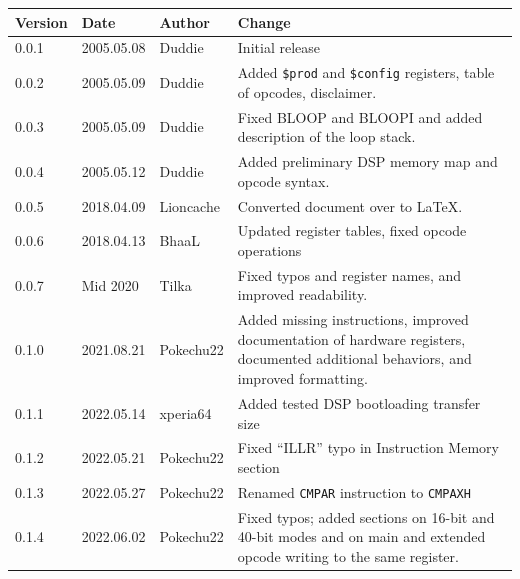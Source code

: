 \documentclass[oneside,english,a4paper,10pt,oneside,openany,final]{memoir}
\newcommand{\Register}[1]{\texttt{#1}}
\begin{document}
\begin{table}[htb]
\centering
\begin{tabular}{|p{.5in}|p{.75in}|p{.75in}|p{3.5in}|}
\hline
\textbf{Version} & \textbf{Date} & \textbf{Author} & \textbf{Change}                                                                          \\ \hline
0.0.1            & 2005.05.08    & Duddie          & Initial release                                                                          \\ \hline
0.0.2            & 2005.05.09    & Duddie          & Added \Register{\$prod} and \Register{\$config} registers, table of opcodes, disclaimer. \\ \hline
0.0.3            & 2005.05.09    & Duddie          & Fixed BLOOP and BLOOPI and added description of the loop stack.                          \\ \hline
0.0.4            & 2005.05.12    & Duddie          & Added preliminary DSP memory map and opcode syntax.                                      \\ \hline
0.0.5            & 2018.04.09    & Lioncache       & Converted document over to LaTeX.                                                        \\ \hline
0.0.6            & 2018.04.13    & BhaaL           & Updated register tables, fixed opcode operations                                         \\ \hline
0.0.7            & Mid 2020      & Tilka           & Fixed typos and register names, and improved readability.                                \\ \hline
0.1.0            & 2021.08.21    & Pokechu22       & Added missing instructions, improved documentation of hardware registers, documented additional behaviors, and improved formatting. \\ \hline
0.1.1            & 2022.05.14    & xperia64        & Added tested DSP bootloading transfer size                                               \\ \hline
0.1.2            & 2022.05.21    & Pokechu22       & Fixed ``ILLR'' typo in Instruction Memory section                                        \\ \hline
0.1.3            & 2022.05.27    & Pokechu22       & Renamed \texttt{CMPAR} instruction to \texttt{CMPAXH}                                    \\ \hline
0.1.4            & 2022.06.02    & Pokechu22       & Fixed typos; added sections on 16-bit and 40-bit modes and on main and extended opcode writing to the same register. \\ \hline

\end{tabular}
\end{table}
\end{document}
